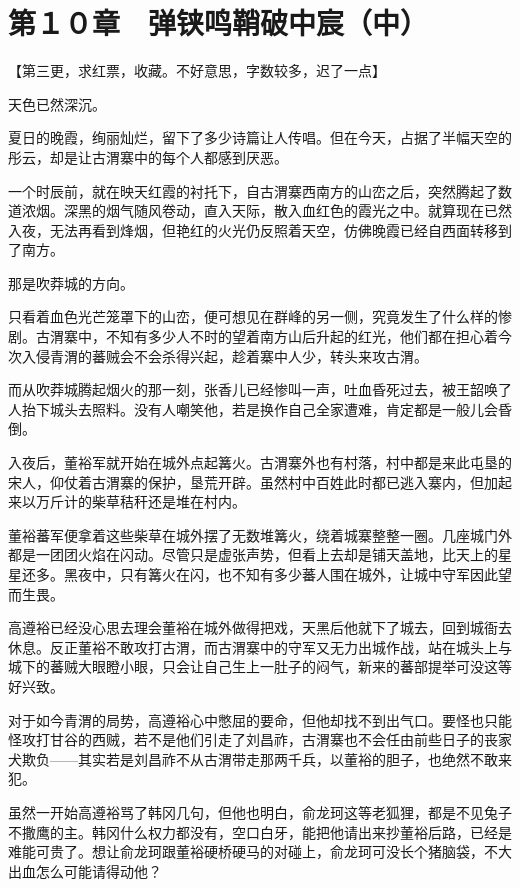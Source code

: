 \section{第１０章　弹铗鸣鞘破中宸（中）}

【第三更，求红票，收藏。不好意思，字数较多，迟了一点】

天色已然深沉。

夏日的晚霞，绚丽灿烂，留下了多少诗篇让人传唱。但在今天，占据了半幅天空的彤云，却是让古渭寨中的每个人都感到厌恶。

一个时辰前，就在映天红霞的衬托下，自古渭寨西南方的山峦之后，突然腾起了数道浓烟。深黑的烟气随风卷动，直入天际，散入血红色的霞光之中。就算现在已然入夜，无法再看到烽烟，但艳红的火光仍反照着天空，仿佛晚霞已经自西面转移到了南方。

那是吹莽城的方向。

只看着血色光芒笼罩下的山峦，便可想见在群峰的另一侧，究竟发生了什么样的惨剧。古渭寨中，不知有多少人不时的望着南方山后升起的红光，他们都在担心着今次入侵青渭的蕃贼会不会杀得兴起，趁着寨中人少，转头来攻古渭。

而从吹莽城腾起烟火的那一刻，张香儿已经惨叫一声，吐血昏死过去，被王韶唤了人抬下城头去照料。没有人嘲笑他，若是换作自己全家遭难，肯定都是一般儿会昏倒。

入夜后，董裕军就开始在城外点起篝火。古渭寨外也有村落，村中都是来此屯垦的宋人，仰仗着古渭寨的保护，垦荒开辟。虽然村中百姓此时都已逃入寨内，但加起来以万斤计的柴草秸秆还是堆在村内。

董裕蕃军便拿着这些柴草在城外摆了无数堆篝火，绕着城寨整整一圈。几座城门外都是一团团火焰在闪动。尽管只是虚张声势，但看上去却是铺天盖地，比天上的星星还多。黑夜中，只有篝火在闪，也不知有多少蕃人围在城外，让城中守军因此望而生畏。

高遵裕已经没心思去理会董裕在城外做得把戏，天黑后他就下了城去，回到城衙去休息。反正董裕不敢攻打古渭，而古渭寨中的守军又无力出城作战，站在城头上与城下的蕃贼大眼瞪小眼，只会让自己生上一肚子的闷气，新来的蕃部提举可没这等好兴致。

对于如今青渭的局势，高遵裕心中憋屈的要命，但他却找不到出气口。要怪也只能怪攻打甘谷的西贼，若不是他们引走了刘昌祚，古渭寨也不会任由前些日子的丧家犬欺负——其实若是刘昌祚不从古渭带走那两千兵，以董裕的胆子，也绝然不敢来犯。

虽然一开始高遵裕骂了韩冈几句，但他也明白，俞龙珂这等老狐狸，都是不见兔子不撒鹰的主。韩冈什么权力都没有，空口白牙，能把他请出来抄董裕后路，已经是难能可贵了。想让俞龙珂跟董裕硬桥硬马的对碰上，俞龙珂可没长个猪脑袋，不大出血怎么可能请得动他？

